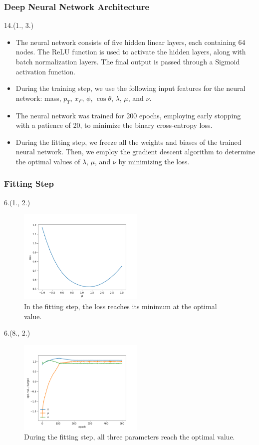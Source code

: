 \documentclass[12pt, xcolor={dvipsnames}, aspectratio = 169, sans,mathserif]{beamer}
\newenvironment{List}[2]
{\begin{textblock}{#1}#2
\begin{itemize}}
{\end{itemize}
\end{textblock}}
\newenvironment{Pic}[2]
{\begin{textblock}{#1}#2
\begin{figure}}
{\end{figure}
\end{textblock}}
\begin{document}
\begin{frame}
\frametitle{Deep Neural Network Architecture}

\begin{List}{14.}{(1., 3.)}

    \item The neural network consists of five hidden linear layers, each containing 64 nodes. The ReLU function is used to activate the hidden layers, along with batch normalization layers. The final output is passed through a Sigmoid activation function.

    \item  During the training step, we use the following input features for the neural network: mass, $p_{T}$, $x_{F}$, $\phi$, $\cos\theta$, $\lambda$, $\mu$, and $\nu$.

    \item The neural network was trained for 200 epochs, employing early stopping with a patience of 20, to minimize the binary cross-entropy loss.

    \item During the fitting step, we freeze all the weights and biases of the trained neural network. Then, we employ the gradient descent algorithm to determine the optimal values of $\lambda$, $\mu$, and $\nu$ by minimizing the loss.

\end{List}

\end{frame}

\begin{frame}
\frametitle{Fitting Step}

\begin{Pic}{6.}{(1., 2.)}
    \includegraphics[width=6.0cm]{imgs/loss1D.png}
    \caption{In the fitting step, the loss reaches its minimum at the optimal value.}
\end{Pic}

\begin{Pic}{6.}{(8., 2.)}
    \includegraphics[width=6.0cm]{imgs/opt_fit_26.png}
    \caption{During the fitting step, all three parameters reach the optimal value.}
\end{Pic}

\end{frame}
\end{document}
